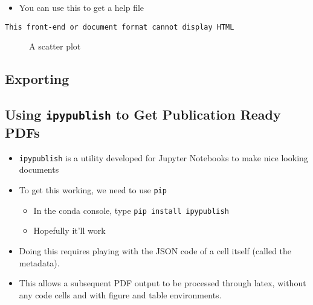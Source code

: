 \documentclass[10pt,parskip=half,
	toc=sectionentrywithdots,
	bibliography=totocnumbered,
	captions=tableheading,numbers=noendperiod]{scrartcl}
\providecommand{\tightlist}{%
  \setlength{\itemsep}{0pt}\setlength{\parskip}{0pt}}
\begin{document}
\begin{itemize}
\tightlist
\item
  You can use this to get a help file
\end{itemize}

\begin{lstlisting}[language={},postbreak={},numbers=none,xrightmargin=7pt,breakindent=0pt,aboveskip=5pt,belowskip=5pt]
This front-end or document format cannot display HTML
\end{lstlisting}

\begin{figure}[H]\begin{center}\end{center}\caption{A scatter plot}\label{fig:flabel}
    \end{figure}

\hypertarget{exporting}{%
\subsection{Exporting}\label{exporting}}

\hypertarget{using-ipypublish-to-get-publication-ready-pdfs}{%
\subsection{\texorpdfstring{Using \texttt{ipypublish} to Get Publication
Ready
PDFs}{Using ipypublish to Get Publication Ready PDFs}}\label{using-ipypublish-to-get-publication-ready-pdfs}}

\begin{itemize}
\tightlist
\item
  \texttt{ipypublish} is a utility developed for Jupyter Notebooks to
  make nice looking documents
\item
  To get this working, we need to use \texttt{pip}

  \begin{itemize}
  \tightlist
  \item
    In the conda console, type \texttt{pip\ install\ ipypublish}
  \item
    Hopefully it'll work
  \end{itemize}
\end{itemize}

\begin{itemize}
\tightlist
\item
  Doing this requires playing with the JSON code of a cell itself
  (called the metadata).
\item
  This allows a subsequent PDF output to be processed through latex,
  without any code cells and with figure and table environments.
\end{itemize}
\end{document}
